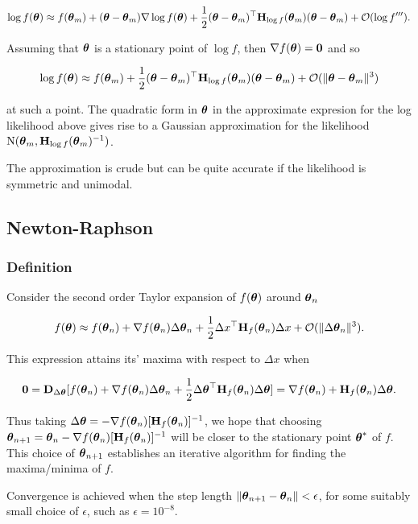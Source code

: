 \documentclass{article}[12pt]
\begin{document}
$$
\log f({\boldsymbol \theta}) \approx f({\boldsymbol \theta}_m) + ({\boldsymbol \theta} - {\boldsymbol \theta}_m) \nabla \log f({\boldsymbol \theta}) + {\frac{1}{2}} ({\boldsymbol \theta} - {\boldsymbol \theta}_m)^\top {\bf H}_{\log f}({\boldsymbol \theta}_m) ({\boldsymbol \theta} - {\boldsymbol \theta}_m) + {\mathcal O}(\log f''').
$$

Assuming that ${\boldsymbol \theta}$ is a stationary point of $\log f$, then $\nabla f({\boldsymbol \theta}) = {\bf 0}$ and so

$$
\log f({\boldsymbol \theta}) \approx f({\boldsymbol \theta}_m) + {\frac{1}{2}} ({\boldsymbol \theta} - {\boldsymbol \theta}_m)^\top {\bf H}_{\log f}({\boldsymbol \theta}_m) ({\boldsymbol \theta} - {\boldsymbol \theta}_m) + {\mathcal O}(\| {\boldsymbol \theta} - {\boldsymbol \theta}_m \|^3)
$$

at such a point. The quadratic form in ${\boldsymbol \theta}$ in the approximate expresion for the log likelihood above gives 
rise to a Gaussian approximation for the likelihood $\text{N}({\boldsymbol \theta}_m, {\bf H}_{\log f}({\boldsymbol \theta}_m)^{-1})$.

The approximation is crude but can be quite accurate if the likelihood is symmetric and unimodal.

\subsection{Newton-Raphson}

\subsubsection{Definition}

Consider the second order Taylor expansion of $f({\boldsymbol \theta})$ around ${\boldsymbol \theta}_{n}$

$$
f({\boldsymbol \theta}) \approx f({\boldsymbol \theta}_{n}) + \nabla f({\boldsymbol \theta}_{n}) \Delta {\boldsymbol\theta}_{n} + {\frac{1}{2}} \Delta x^\top {\bf H}_f({\boldsymbol \theta}_{n}) \Delta x + {\mathcal O}(\| \Delta {\boldsymbol\theta}_{n} \|^3).
$$

This expression attains its' maxima with respect to $\Delta x$ when

$$
{\bf 0} = {\bf D}_{\Delta {\boldsymbol\theta}} [f({\boldsymbol \theta}_{n}) + \nabla f({\boldsymbol \theta}_{n}) \Delta {\boldsymbol\theta}_{n} + {\frac{1}{2}} \Delta {\boldsymbol\theta}^\top {\bf H}_f({\boldsymbol \theta}_{n}) \Delta {\boldsymbol\theta}] = \nabla f({\boldsymbol \theta}_n) + {\bf H}_f({\boldsymbol \theta}_n) \Delta {\boldsymbol\theta}.
$$

Thus taking $\Delta {\boldsymbol\theta} = -\nabla f({\boldsymbol \theta}_n) [{\bf H}_f({\boldsymbol \theta}_n)]^{-1}$, we hope that choosing
${\boldsymbol \theta}_{n + 1} = {\boldsymbol \theta}_{n} - \nabla f({\boldsymbol \theta}_n) [{\bf H}_f({\boldsymbol \theta}_n)]^{-1}$ will be closer to the stationary 
point ${\boldsymbol \theta}^*$ of $f$. This choice of ${\boldsymbol \theta}_{n+1}$ establishes an iterative algorithm for finding the 
maxima/minima of $f$.

Convergence is achieved when the step length $\| {\boldsymbol \theta}_{n+1} - {\boldsymbol \theta}_{n} \| < \epsilon$, for some
suitably small choice of $\epsilon$, such as $\epsilon = 10^{-8}$.
\end{document}
